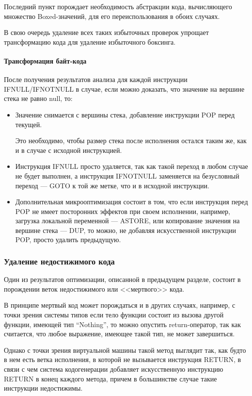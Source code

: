 Последний пункт порождает необходимость абстракции кода, вычисляющего множество Boxed-значений,
для его переиспользования в обоих случаях.

В свою очередь удаление всех таких избыточных проверок упрощает трансформацию кода для
удаление избыточного боксинга.

\paragraph{Трансформация байт-кода}
После получения результатов анализа для каждой инструкции IFNULL/IFNOTNULL в случае, если можно
доказать, что значение на вершине стека не равно null, то:
\begin{itemize}
    \item Значение снимается с вершины стека, добавление инструкции POP перед текущей.

    Это необходимо, чтобы размер стека после исполнения остался таким же, как и в случае
    с исходной инструкцией.

    \item Инструкция IFNULL просто удаляется, так как такой переход в любом случае не будет
    выполнен, а инструкция IFNOTNULL заменяется на безусловный переход --- GOTO к той же метке,
    что и в исходной инструкции.

    \item Дополнительная микрооптимизация состоит в том, что если инструкция перед POP не имеет
    посторонних эффектов при своем исполнении, например, загрузка локальной переменной --- ASTORE,
    или копирование значения на вершине стека --- DUP, то можно, не добавляя искусственной инструкции
    POP, просто удалить предыдущую.
\end{itemize}

\subsubsection{Удаление недостижимого кода}
Один из результатов оптимизации, описанной в предыдущем разделе, состоит в порождении веток
недостижимого или <<мертвого>> кода.

В принципе мертвый код может порождаться и в других случаях, например, с точки зрения системы типов
если тело функции состоит из вызова другой функции, имеющей тип ``Nothing'', то можно опустить
return-оператор, так как считается, что любое выражение, имеющее такой тип, не может завершиться.

Однако с точки зрения виртуальной машины такой метод выглядит так, как будто в нем есть ветка
исполнения, в которой не вызывается инструкция RETURN, в связи с чем система кодогенерации
добавляет искусственную инструкцию RETURN в конец каждого метода, причем в большинстве
случае такие инструкции недостижимы.

